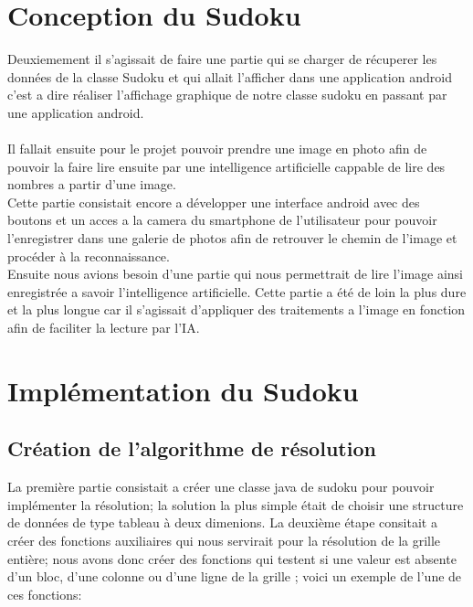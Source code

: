 \documentclass{article}
\begin{document}
\section{Conception du Sudoku}


Deuxiemement il s'agissait de faire une partie qui se charger de récuperer les données de la classe Sudoku et qui allait l'afficher dans une application android c'est a dire réaliser l'affichage graphique de notre classe sudoku en passant par une application android.\\\\
Il fallait ensuite pour le projet pouvoir prendre une image en photo afin de pouvoir la faire lire ensuite par une intelligence artificielle cappable de lire des nombres a partir d'une image.\\
Cette partie consistait encore a développer une interface android avec des boutons et un acces a la camera du smartphone de l'utilisateur pour pouvoir l'enregistrer dans une galerie de photos afin de  retrouver le chemin de l'image et procéder à la reconnaissance.\\

Ensuite nous avions besoin d'une partie qui nous permettrait de lire l'image ainsi enregistrée a savoir l'intelligence artificielle.
Cette partie a été de loin la plus dure et la plus longue car il s'agissait d'appliquer des traitements a l'image en fonction afin de faciliter la lecture par l'IA.




\subsection{}


\newpage
\section{Implémentation du Sudoku}

\subsection{Création de l'algorithme de résolution}

La première partie consistait a créer une classe java de sudoku pour pouvoir implémenter la résolution; la solution la plus simple était de choisir une structure de données de type tableau à deux dimenions.
\newline
\newline La deuxième étape consitait a créer des fonctions auxiliaires qui nous servirait pour la résolution de la grille entière; nous avons donc créer des fonctions qui testent si une valeur est absente d'un bloc, d'une colonne ou d'une ligne de la grille ; voici un exemple de l'une de ces fonctions:\\
\end{document}
